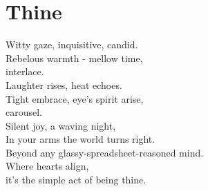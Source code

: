 \documentclass[a4paper,twoside, openany]{book}
\newenvironment{Verse}
  {\center\varwidth{\linewidth}\fontsize{18}{21.6}\selectfont}
  {\endvarwidth\endcenter}
\begin{document}
\chapter{Thine}
\begin{Verse}
Witty gaze, inquisitive, candid.\\
Rebelous warmth - mellow time,\\
interlace.\\
\newline
Laughter rises, heat echoes.\\
Tight embrace, eye's spirit arise,\\
carousel.\\
\newline
Silent joy, a waving night,\\
In your arms the world turns right.\\
\newline
Beyond any glassy-spreadsheet-reasoned mind.\\
\newline
Where hearts align,\\
it's the simple act of being thine.
\end{Verse}
\newpage\null\thispagestyle{empty}\newpage
\end{document}
